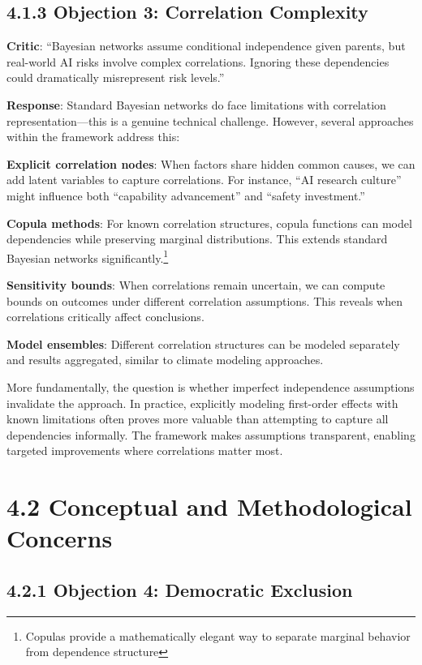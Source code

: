 \documentclass[
  11pt,
  letterpaper,
]{book}
\begin{document}
\subsection{4.1.3 Objection 3: Correlation
Complexity}\label{sec-correlation-complexity}

\textbf{Critic}: ``Bayesian networks assume conditional independence
given parents, but real-world AI risks involve complex correlations.
Ignoring these dependencies could dramatically misrepresent risk
levels.''

\textbf{Response}: Standard Bayesian networks do face limitations with
correlation representation---this is a genuine technical challenge.
However, several approaches within the framework address this:

\textbf{Explicit correlation nodes}: When factors share hidden common
causes, we can add latent variables to capture correlations. For
instance, ``AI research culture'' might influence both ``capability
advancement'' and ``safety investment.''

\textbf{Copula methods}: For known correlation structures, copula
functions can model dependencies while preserving marginal
distributions. This extends standard Bayesian networks
significantly.\footnote{Copulas provide a mathematically elegant way to
  separate marginal behavior from dependence structure}

\textbf{Sensitivity bounds}: When correlations remain uncertain, we can
compute bounds on outcomes under different correlation assumptions. This
reveals when correlations critically affect conclusions.

\textbf{Model ensembles}: Different correlation structures can be
modeled separately and results aggregated, similar to climate modeling
approaches.

More fundamentally, the question is whether imperfect independence
assumptions invalidate the approach. In practice, explicitly modeling
first-order effects with known limitations often proves more valuable
than attempting to capture all dependencies informally. The framework
makes assumptions transparent, enabling targeted improvements where
correlations matter most.

\section{4.2 Conceptual and Methodological
Concerns}\label{sec-conceptual-concerns}

\subsection{4.2.1 Objection 4: Democratic
Exclusion}\label{sec-democratic-exclusion}
\end{document}
